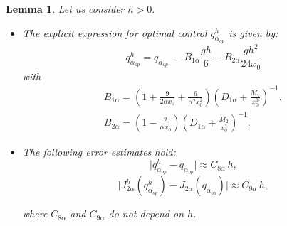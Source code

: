 \documentclass[11pt]{article}
\newtheorem{Lemma}{Lemma}
\begin{document}
\begin{Lemma} Let us consider $h>0.$
    
     \begin{itemize}
      \item[(a)]  The explicit expression for optimal control ${q^h_{\alpha_{op}}} $ is given by:     
     \begin{equation}\label{qhalphaop}
      { q^h_{\alpha_{op}}} = q_{\alpha_{op},}-B_{1\alpha}\frac{gh}{6}-B_{2\alpha}\frac{g h^2}{24 x_0} 
     \end{equation}
     with   $$\begin{array}{cc}
     B_{1\alpha}=\left(1+\tfrac{9}{2\alpha x_0}+\tfrac{6}{\alpha^2 x_0^2}\right) \left(D_{1\alpha}+\tfrac{M_2}{x_0^3} \right)^{-1},\\[0.45cm]
      B_{2\alpha}=\left(1-\tfrac{2}{\alpha x_0}\right) \left(D_{1\alpha}+\tfrac{M_2}{x_0^3} \right)^{-1}.\end{array}$$
     
     \noindent 
     
      \item[(b)]The following error estimates hold:
     		\begin{equation}\label{qhalphaop-qalphaop}
     		\lvert { q^h_{\alpha_{op}}} - q_{\alpha_{op}} \rvert \approx C_{8\alpha} \, h ,
     		\end{equation}
     		\begin{equation}\label{J2halpha qhalphaop-J2alpha qalphaop}
     	    \Big \lvert  { J^h_{2 \alpha}}({ q^h_{\alpha_{op}}}) -  J_{2\alpha}(q_{\alpha_{op}}) \Big \rvert \approx C_{9\alpha} \, h,
     	    \end{equation}
     		     		
    		
        where $C_{8\alpha}$  and $C_{9\alpha}$  do not depend on $h$.
     
     \end{itemize}
    \end{Lemma}
\end{document}
